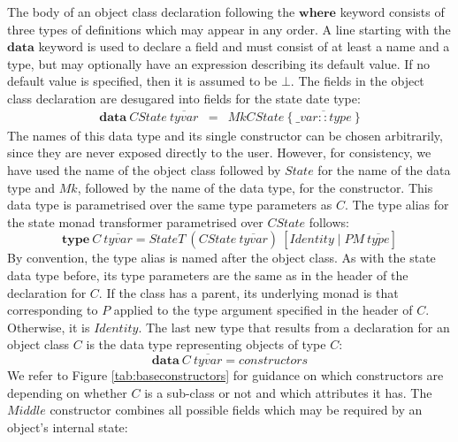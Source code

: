 The body of an object class declaration following the $\mathbf{where}$ keyword consists of three types of definitions which may appear in any order. A line starting with the $\mathbf{data}$ keyword is used to declare a field and must consist of at least a name and a type, but may optionally have an expression describing its default value. If no default value is specified, then it is assumed to be $\bot$. The fields in the object class declaration are desugared into fields for the state date type: 
\begin{displaymath}
\begin{array}{lcl}
\mathbf{data}~\mathit{CState}~\overline{\mathit{tyvar}} & = & \mathit{MkCState}~\{~\overline{\_\mathit{var} :: \mathit{type}}~\}
\end{array}
\end{displaymath}
The names of this data type and its single constructor can be chosen arbitrarily, since they are never exposed directly to the user. However, for consistency, we have used the name of the object class followed by $\mathit{State}$ for the name of the data type and $\mathit{Mk}$, followed by the name of the data type, for the constructor. This data type is parametrised over the same type parameters as $C$. The type alias for the state monad transformer parametrised over $\mathit{CState}$ follows:
\begin{displaymath}
\mathbf{type}~\mathit{C}~\overline{\mathit{tyvar}} = \mathit{StateT}~(\mathit{CState}~\overline{\mathit{tyvar}})~[\mathit{Identity} \mid PM~\overline{\mathit{type}}]
\end{displaymath}
By convention, the type alias is named after the object class. As with the state data type before, its type parameters are the same as in the header of the declaration for $C$. If the class has a parent, its underlying monad is that corresponding to $P$ applied to the type argument specified in the header of $C$. Otherwise, it is $\mathit{Identity}$. The last new type that results from a declaration for an object class $C$ is the data type representing objects of type $C$:
\begin{displaymath}
\mathbf{data}~\mathit{C}~\overline{\mathit{tyvar}} = \mathit{constructors}
\end{displaymath}
We refer to Figure \ref{tab:baseconstructors} for guidance on which constructors are depending on whether $C$ is a sub-class or not and which attributes it has. The $\mathit{Middle}$ constructor combines all possible fields which may be required by an object's internal state:
